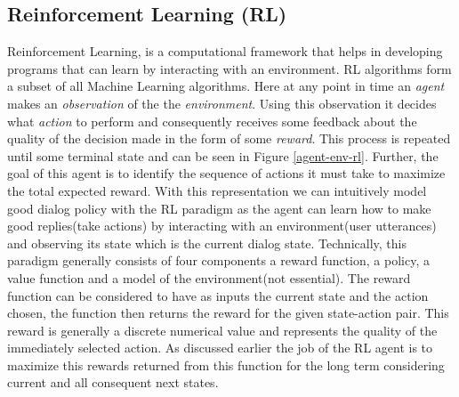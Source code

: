 \documentclass[12pt]{extarticle}
\numberwithin{equation}{section}
\begin{document}
	\subsection{Reinforcement Learning (RL)}
	Reinforcement Learning, is a computational framework that helps in developing programs that can learn by interacting with an environment. RL algorithms form a subset of all Machine Learning algorithms. Here at any point in time an \textit{agent} makes an \textit{observation} of the the \textit{environment}. Using this observation it decides what \textit{action} to perform and consequently receives some feedback about the quality of the decision made in the form of some \textit{reward}. This process is repeated until some terminal state and can be seen in Figure \ref{agent-env-rl}. Further, the goal of this agent is to identify the sequence of actions it must take to maximize the total expected reward. With this representation we can intuitively model good dialog policy with the RL paradigm as the agent can learn how to make good replies(take actions) by interacting with an environment(user utterances) and observing its state which is the current dialog state. Technically, this paradigm generally consists of four components a reward function, a policy, a value function and a model of the environment(not essential). The reward function can be considered to have as inputs the current state and the action chosen, the function then returns the reward for the given state-action pair. This reward is generally a discrete numerical value and represents the quality of the immediately selected action. As discussed earlier the job of the RL agent is to maximize this rewards returned from this function for the long term considering current and all consequent next states.
	
\end{document}
